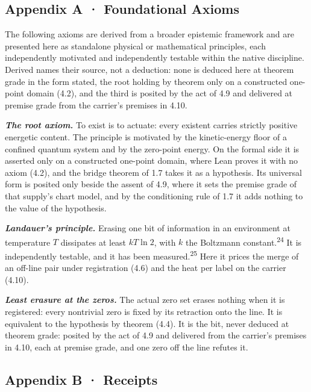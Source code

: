 \documentclass[10pt]{article}
\begin{document}
\hypertarget{appendix-a-foundational-axioms}{%
\subsection{Appendix A · Foundational
Axioms}\label{appendix-a-foundational-axioms}}

The following axioms are derived from a broader epistemic framework and
are presented here as standalone physical or mathematical principles,
each independently motivated and independently testable within the
native discipline. Derived names their source, not a deduction: none is
deduced here at theorem grade in the form stated, the root holding by
theorem only on a constructed one-point domain (4.2), and the third is
posited by the act of 4.9 and delivered at premise grade from the
carrier's premises in 4.10.

\textbf{\emph{The root axiom.}} To exist is to actuate: every existent
carries strictly positive energetic content. The principle is motivated
by the kinetic-energy floor of a confined quantum system and by the
zero-point energy. On the formal side it is asserted only on a
constructed one-point domain, where Lean proves it with no axiom (4.2),
and the bridge theorem of 1.7 takes it as a hypothesis. Its universal
form is posited only beside the assent of 4.9, where it sets the premise
grade of that supply's chart model, and by the conditioning rule of 1.7
it adds nothing to the value of the hypothesis.

\textbf{\emph{Landauer's principle.}} Erasing one bit of information in
an environment at temperature \(T\) dissipates at least \(kT \ln 2\),
with \(k\) the Boltzmann constant.\textsuperscript{24} It is
independently testable, and it has been measured.\textsuperscript{25}
Here it prices the merge of an off-line pair under registration (4.6)
and the heat per label on the carrier (4.10).

\textbf{\emph{Least erasure at the zeros.}} The actual zero set erases
nothing when it is registered: every nontrivial zero is fixed by its
retraction onto the line. It is equivalent to the hypothesis by theorem
(4.4). It is the bit, never deduced at theorem grade: posited by the act
of 4.9 and delivered from the carrier's premises in 4.10, each at
premise grade, and one zero off the line refutes it.

\hypertarget{appendix-b-receipts}{%
\subsection{Appendix B · Receipts}\label{appendix-b-receipts}}
\end{document}
